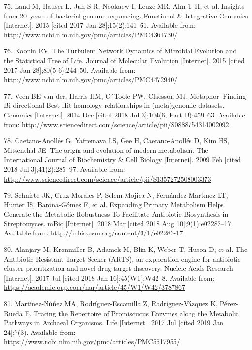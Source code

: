 \documentclass[12pt,twoside]{reedthesis}
\begin{document}
  \hypertarget{ref-land_insights_2015}{}
  75. Land M, Hauser L, Jun S-R, Nookaew I, Leuze MR, Ahn T-H, et al.
  Insights from 20~years of bacterial genome sequencing. Functional \&
  Integrative Genomics {[}Internet{]}. 2015 {[}cited 2017 Jan
  28{]};15(2):141--61. Available from:
  \url{http://www.ncbi.nlm.nih.gov/pmc/articles/PMC4361730/}
  
  \hypertarget{ref-koonin_turbulent_2015}{}
  76. Koonin EV. The Turbulent Network Dynamics of Microbial Evolution and
  the Statistical Tree of Life. Journal of Molecular Evolution
  {[}Internet{]}. 2015 {[}cited 2017 Jan 28{]};80(5-6):244--50. Available
  from: \url{http://www.ncbi.nlm.nih.gov/pmc/articles/PMC4472940/}
  
  \hypertarget{ref-van_der_veen_metaphor_2014}{}
  77. Veen BE van der, Harris HM, O´Toole PW, Claesson MJ. Metaphor:
  Finding Bi-directional Best Hit homology relationships in (meta)genomic
  datasets. Genomics {[}Internet{]}. 2014 Dec {[}cited 2018 Jul
  3{]};104(6, Part B):459--63. Available from:
  \url{http://www.sciencedirect.com/science/article/pii/S0888754314002092}
  
  \hypertarget{ref-caetano-anolles_origin_metabolism_2009}{}
  78. Caetano-Anollés G, Yafremava LS, Gee H, Caetano-Anollés D, Kim HS,
  Mittenthal JE. The origin and evolution of modern metabolism. The
  International Journal of Biochemistry \& Cell Biology {[}Internet{]}.
  2009 Feb {[}cited 2018 Jul 3{]};41(2):285--97. Available from:
  \url{http://www.sciencedirect.com/science/article/pii/S1357272508003373}
  
  \hypertarget{ref-schniete_expanding_2018}{}
  79. Schniete JK, Cruz-Morales P, Selem-Mojica N, Fernández-Martínez LT,
  Hunter IS, Barona-Gómez F, et al. Expanding Primary Metabolism Helps
  Generate the Metabolic Robustness To Facilitate Antibiotic Biosynthesis
  in Streptomyces. mBio {[}Internet{]}. 2018 Mar {[}cited 2018 Aug
  10{]};9(1):e02283--17. Available from:
  \url{http://mbio.asm.org/content/9/1/e02283-17}
  
  \hypertarget{ref-alanjary_antibiotic_2017}{}
  80. Alanjary M, Kronmiller B, Adamek M, Blin K, Weber T, Huson D, et al.
  The Antibiotic Resistant Target Seeker (ARTS), an exploration engine for
  antibiotic cluster prioritization and novel drug target discovery.
  Nucleic Acids Research {[}Internet{]}. 2017 Jul {[}cited 2018 Jan
  16{]};45(W1):W42--8. Available from:
  \url{https://academic.oup.com/nar/article/45/W1/W42/3787867}
  
  \hypertarget{ref-martinez-nunez_promiscuity_Archaea_2017}{}
  81. Martínez-Núñez MA, Rodríguez-Escamilla Z, Rodríguez-Vázquez K,
  Pérez-Rueda E. Tracing the Repertoire of Promiscuous Enzymes along the
  Metabolic Pathways in Archaeal Organisms. Life {[}Internet{]}. 2017 Jul
  {[}cited 2019 Jan 24{]};7(3). Available from:
  \url{https://www.ncbi.nlm.nih.gov/pmc/articles/PMC5617955/}
  
\end{document}
